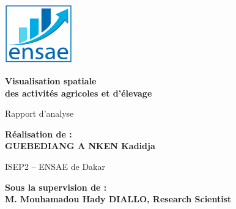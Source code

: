 \begin{titlepage}

\begin{center}
\begin{minipage}[c][0.95\textheight][c]{0.98\textwidth}
  \centering

  \includegraphics[width=0.22\textwidth]{logo_ENSAE.png} \\
  \vspace{1.8cm}

  {\Huge \bfseries Visualisation spatiale \\[0.3cm] des activités agricoles et d'élevage\par}
  \vspace{1.8cm}

  {\Large Rapport d'analyse \par}
  \vspace{2.5cm}

  {\LARGE \textbf{Réalisation de :}\\[0.3cm] \textbf{GUEBEDIANG A NKEN Kadidja} \par}
  \vspace{1.2cm}

  {\Large ISEP2 – ENSAE de Dakar \par}
  \vspace{1.2cm}

  {\LARGE \textbf{Sous la supervision de :}\\[0.3cm] \textbf{M. Mouhamadou Hady DIALLO, Research Scientist} \par}
  \vspace{1.2cm}

\end{minipage}
\end{center}

\end{titlepage}
